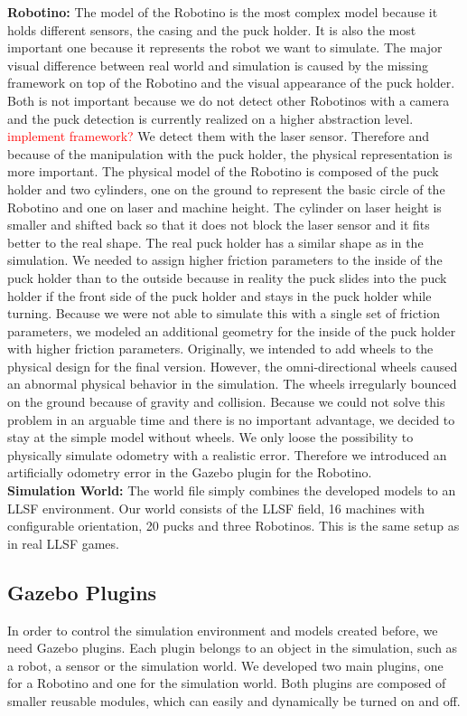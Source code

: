 \textbf{Robotino:} The model of the Robotino is the most complex model because it holds different sensors, the casing and the puck holder. It is also the most important one because it represents the robot we want to simulate. The major visual difference between real world and simulation is caused by the missing framework on top of the Robotino and the visual appearance of the puck holder. Both is not important because we do not detect other Robotinos with a camera and the puck detection is currently realized on a higher abstraction level. \textcolor{red}{implement framework?} We detect them with the laser sensor. Therefore and because of the manipulation with the puck holder, the physical representation is more important. The physical model of the Robotino is composed of the puck holder and two cylinders, one on the ground to represent the basic circle of the Robotino and one on laser and machine height. The cylinder on laser height is smaller and shifted back so that it does not block the laser sensor and it fits better to the real shape. The real puck holder has a similar shape as in the simulation. We needed to assign higher friction parameters to the inside of the puck holder than to the outside because in reality the puck slides into the puck holder if the front side of the puck holder and stays in the puck holder while turning. Because we were not able to simulate this with a single set of friction parameters, we modeled an additional geometry for the inside of the puck holder with higher friction parameters. Originally, we intended to add wheels to the physical design for the final version. However, the omni-directional wheels caused an abnormal physical behavior in the simulation. The wheels irregularly bounced on the ground because of gravity and collision. Because we could not solve this problem in an arguable time and there is no important advantage, we decided to stay at the simple model without wheels. We only loose the possibility to physically simulate odometry with a realistic error. Therefore we introduced an artificially odometry error in the Gazebo plugin for the Robotino.\\
\textbf{Simulation World:} The world file simply combines the developed models to an LLSF environment. Our world consists of the LLSF field, 16 machines with configurable orientation, 20 pucks and three Robotinos. This is the same setup as in real LLSF games.\\


\subsection{Gazebo Plugins}
In order to control the simulation environment and models created before, we need Gazebo plugins. Each plugin belongs to an object in the simulation, such as a robot, a sensor or the simulation world. We developed two main plugins, one for a Robotino and one for the simulation world. Both plugins are composed of smaller reusable modules, which can easily and dynamically be turned on and off.


